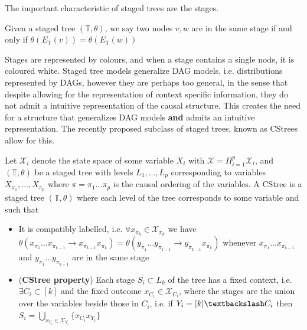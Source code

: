 \documentclass{tufte-book}
\begin{document}
\begin{Definition}
The important characteristic of staged trees are the stages. 

\begin{definition}[Stages]

Given a staged tree $(\mathbb{T},\theta)$, we say two nodes $v,w$ are in the same stage if and only if  $\theta(E_\mathbb{T}(v)) = \theta(E_\mathbb{T}(w))$

\end{definition}


Stages are represented by colours, and when a stage contains a single node, it is coloured white. Staged tree models generalize DAG models, i.e. distributions represented by DAGs, however they are perhaps too general, in the sense that despite allowing for the representation of context specific information, they do not admit a intuitive representation of the causal structure. This creates the need for a structure that generalizes DAG models \textbf{and} admits an intuitive representation. The recently proposed subclass of staged trees, known as CStrees allow for this.

\begin{definition}[CStrees]\label{def:cstree}
Let $\mathcal{X}_i$ denote the state space of some variable $X_i$ with $\mathcal{X} = \Pi_{i=1}^p \mathcal{X}_i$, and $(\mathbb{T},\theta)$ be a staged tree with levels $L_1,...,L_p$ corresponding to variables $X_{\pi_1},...,X_{\pi_p}$ where $\pi = \pi_1...\pi_p$ is the causal ordering of the variables.  
A CStree is a staged tree $(\mathbb{T}, \theta)$ where each level of the tree corresponds to some variable and  such that 
\begin{itemize}
\item It is compatibly labelled, i.e. $\forall x_{\pi_k} \in \mathcal{X}_{\pi_k}$ we have $\theta(x_{\pi_1}...x_{\pi_{k-1}}\rightarrow x_{\pi_{k-1}}x_{\pi_k}) = \theta(y_{\pi_1}...y_{\pi_{k-1}}\rightarrow y_{\pi_{k-1}}x_{\pi_k})$ whenever $x_{\pi_1}...x_{\pi_{k-1}}$ and $y_{\pi_1}...y_{\pi_{k-1}}$ are in the same stage
\item (\textbf{CStree property}) Each stage $S_i \subset L_k$ of the tree has a fixed context, i.e. $\exists C_i \subset [k]$ and the fixed outcome $x_{C_i} \in \mathcal{X}_{C_i}$, where the stages are the union over the variables beside those in $C_i$, i.e. if $Y_i = [k] \textbackslash C_i$ then $S_i = \bigcup_{x_{Y_i} \in \mathcal{X}_{Y_i}} \{x_{C_i}x_{Y_i} \}$  
\end{itemize}
\end{definition}




\end{Definition}
\end{document}
